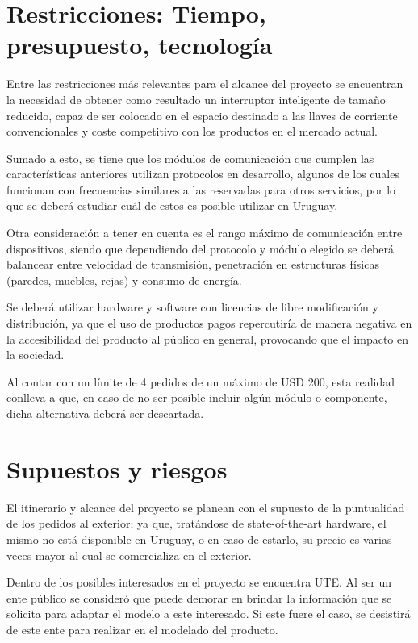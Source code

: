\section{Restricciones: Tiempo, presupuesto, tecnología}

Entre las restricciones más relevantes para el alcance del proyecto se encuentran la necesidad de obtener como resultado un interruptor inteligente de tamaño reducido, capaz de ser colocado en el espacio destinado a las llaves de corriente convencionales y coste competitivo con los productos en el mercado actual. 

Sumado a esto, se tiene que los módulos de comunicación que cumplen las características anteriores utilizan protocolos en desarrollo, algunos de los cuales funcionan con frecuencias similares a las reservadas para otros servicios, por lo que se deberá estudiar cuál de estos es posible utilizar en Uruguay.

Otra consideración a tener en cuenta es el rango máximo de comunicación entre dispositivos, siendo que dependiendo del protocolo y módulo elegido se deberá balancear entre velocidad de transmisión, penetración en estructuras físicas (paredes, muebles, rejas) y consumo de energía.

Se deberá utilizar hardware y software con licencias de libre modificación y distribución, ya que el uso de productos pagos repercutiría de manera negativa en la accesibilidad del producto al público en general, provocando que el impacto en la sociedad.

Al contar con un límite de 4 pedidos de un máximo de USD 200, esta realidad conlleva a que, en caso de no ser posible incluir algún módulo o componente, dicha alternativa deberá ser descartada.

\section{Supuestos y riesgos}

El itinerario y alcance del proyecto se planean con el supuesto de la puntualidad de los pedidos al exterior; ya que, tratándose de state-of-the-art hardware, el mismo no está disponible en Uruguay, o en caso de estarlo, su precio es varias veces mayor al cual se comercializa en el exterior. 

Dentro de los posibles interesados en el proyecto se encuentra UTE. Al ser un ente público se consideró que puede demorar en brindar la información que se solicita para adaptar el modelo a este interesado. Si este fuere el caso, se desistirá de este ente para realizar en el modelado del producto.

